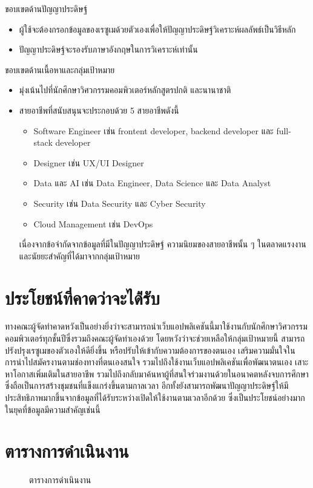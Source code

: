 ขอบเขตด้านปัญญาประดิษฐ์
\begin{itemize}
    \item  ผู้ใช้จะต้องกรอกข้อมูลของเรซูเมด้วยตัวเองเพื่อให้ปัญญาประดิษฐ์วิเคราะห์ผลลัพธ์เป็นวิธีหลัก
    \item  ปัญญาประดิษฐ์จะรองรับภาษาอังกฤษในการวิเคราะห์เท่านั้น
\end{itemize}

ขอบเขตด้านเนื้อหาและกลุ่มเป้าหมาย
\begin{itemize}
    \item  มุ่งเน้นไปที่นักศึกษาวิศวกรรมคอมพิวเตอร์หลักสูตรปกติ และนานาชาติ
    \item  สายอาชีพที่สนับสนุนจะประกอบด้วย 5 สายอาชีพดังนี้
    \begin{itemize}
        \item Software Engineer เช่น frontent developer, backend developer และ full-stack developer
        \item Designer เช่น UX/UI Designer
        \item Data และ AI เช่น Data Engineer, Data Science และ Data Analyst
        \item Security เช่น Data Security และ Cyber Security
        \item Cloud Management เช่น DevOps
    \end{itemize}
    เนื่องจากข้อจำกัดจากข้อมูลที่มีในปัญญาประดิษฐ์ ความนิยมของสายอาชีพนั้น ๆ ในตลาดแรงงาน และนัยยะสำคัญที่ได้มาจากกลุ่มเป้าหมาย
\end{itemize}

\section{ประโยชน์ที่คาดว่าจะได้่รับ}

ทางคณะผู้จัดทำคาดหวังเป็นอย่างยิ่งว่าจะสามารถนำเว็บแอปพลิเคชันนี้มาใช้งานกับนักศึกษาวิศวกรรมคอมพิวเตอร์ทุกชั้นปีซึ่งรวมถึงคณะผู้จัดทำเองด้วย โดยหวังว่าจะช่วยเหลือให้กลุ่มเป้าหมายนี้ สามารถปรังปรุงเรซูเมของตัวเองให้ดียิ่งขึ้น หรือปรับให้เข้ากับความต้องการของตนเอง เสริมความมั่นใจในการนำไปสมัครงานตามช่องทางที่ตนเองสนใจ รวมไปถึงใช้งานเว็บแอปพลิเคชันเพื่อพัฒนาตนเอง เสาะหาโอกาสเพิ่มเติมในสายอาชีพ รวมไปถึงกลับมาค้นหาผู้ที่สนใจร่วมงานด้วยในอนาคตหลังจบการศึกษา ซึ่งถือเป็นการสร้างชุมชนที่แข็งแกร่งขึ้นตามกาลเวลา อีกทั้งยังสามารถพัฒนาปัญญาประดิษฐ์ให้มีประสิทธิภาพมากขึ้นจากข้อมูลที่ได้รับระหว่างเปิดให้ใช้งานตามเวลาอีกด้วย ซึ่งเป็นประโยชน์อย่างมากในยุคที่ข้อมูลมีความสำคัญเช่นนี้

\section{ตารางการดำเนินงาน}
\begin{figure}[!h]\centering
    \setlength{\fboxrule}{0.2mm}
    \setlength{\fboxsep}{0.5cm}
    \caption{ตารางการดำเนินงาน}\label{fig:model4}
\end{figure}